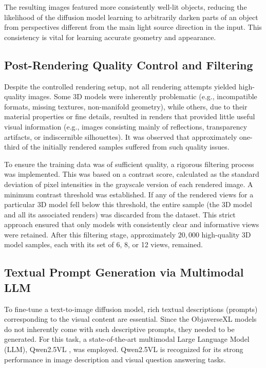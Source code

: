 The resulting images featured more consistently well-lit objects, reducing the likelihood of the diffusion model learning to arbitrarily darken parts of an object from perspectives different from the main light source direction in the input. This consistency is vital for learning accurate geometry and appearance.

\subsection{Post-Rendering Quality Control and Filtering}\label{ssec:quality-control}
Despite the controlled rendering setup, not all rendering attempts yielded high-quality images. Some 3D models were inherently problematic (e.g., incompatible formats, missing textures, non-manifold geometry), while others, due to their material properties or fine details, resulted in renders that provided little useful visual information (e.g., images consisting mainly of reflections, transparency artifacts, or indiscernible silhouettes). It was observed that approximately one-third of the initially rendered samples suffered from such quality issues.

To ensure the training data was of sufficient quality, a rigorous filtering process was implemented. This was based on a contrast score, calculated as the standard deviation of pixel intensities in the grayscale version of each rendered image. A minimum contrast threshold was established. If any of the rendered views for a particular 3D model fell below this threshold, the entire sample (the 3D model and all its associated renders) was discarded from the dataset. This strict approach ensured that only models with consistently clear and informative views were retained. After this filtering stage, approximately $20,000$ high-quality 3D model samples, each with its set of 6, 8, or 12 views, remained.

\subsection{Textual Prompt Generation via Multimodal LLM}\label{ssec:text-generation}
To fine-tune a text-to-image diffusion model, rich textual descriptions (prompts) corresponding to the visual content are essential. Since the ObjaverseXL models do not inherently come with such descriptive prompts, they needed to be generated. For this task, a state-of-the-art multimodal Large Language Model (LLM), Qwen2.5VL \cite{qwen25vl}, was employed. Qwen2.5VL is recognized for its strong performance in image description and visual question answering tasks.

